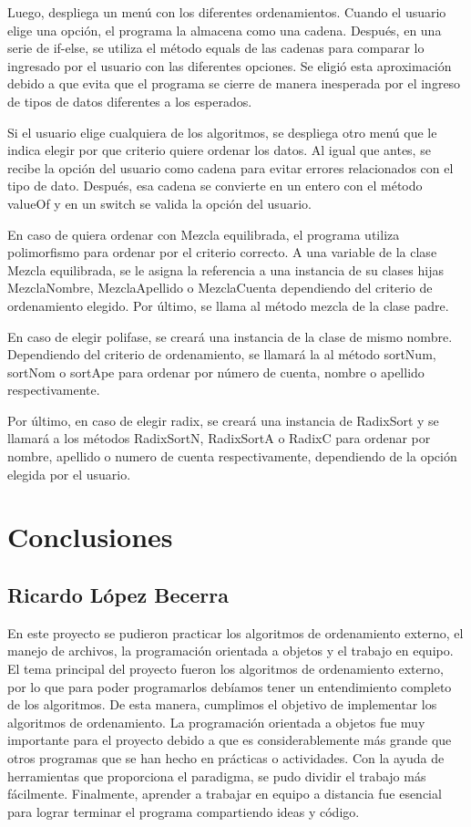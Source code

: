 \documentclass[11pt]{article}
\begin{document}
 Luego, despliega un menú con los diferentes ordenamientos. Cuando el usuario elige una opción, el programa la almacena como una cadena. Después, en una serie de if-else, se utiliza el método equals de las cadenas para comparar lo ingresado por el usuario con las diferentes opciones. Se eligió esta aproximación debido a que evita que el programa se cierre de manera inesperada por el ingreso de tipos de datos diferentes a los esperados.
\par
Si el usuario elige cualquiera de los algoritmos, se despliega otro menú que le indica elegir por que criterio quiere ordenar los datos. Al igual que antes, se recibe la opción del usuario como cadena para evitar errores relacionados con el tipo de dato. Después, esa cadena se convierte en un entero con el método valueOf y en un switch se valida la opción del usuario. 
\par
En caso de quiera ordenar con Mezcla equilibrada, el programa utiliza polimorfismo para ordenar por el criterio correcto. A una variable de la clase Mezcla equilibrada, se le asigna la referencia a una instancia de su clases hijas MezclaNombre, MezclaApellido o MezclaCuenta dependiendo del criterio de ordenamiento elegido. Por último, se llama al método mezcla de la clase padre.
\par
En caso de elegir polifase, se creará una instancia de la clase de mismo nombre. Dependiendo del criterio de ordenamiento, se llamará la al método sortNum, sortNom o sortApe para ordenar por número de cuenta, nombre o apellido respectivamente.
\par
Por último, en caso de elegir radix, se creará una instancia de RadixSort y se llamará a los métodos RadixSortN, RadixSortA o RadixC para ordenar por nombre, apellido o numero de cuenta respectivamente, dependiendo de la opción elegida por el usuario.
\section{Conclusiones}

\subsection{Ricardo López Becerra}
En este proyecto se pudieron practicar los algoritmos de ordenamiento externo, el manejo de archivos, la programación orientada a objetos y el trabajo en equipo.
El tema principal del proyecto fueron los algoritmos de ordenamiento externo, por lo que para poder programarlos debíamos tener un entendimiento completo de los algoritmos. De esta manera, cumplimos el objetivo de implementar los algoritmos de ordenamiento.
La programación orientada a objetos fue muy importante para el proyecto debido a que es considerablemente más grande que otros programas que se han hecho en prácticas o actividades. Con la ayuda de herramientas que proporciona el paradigma, se pudo dividir el trabajo más fácilmente.
Finalmente, aprender a trabajar en equipo a distancia fue esencial para lograr terminar el programa compartiendo ideas y código.
\end{document}
